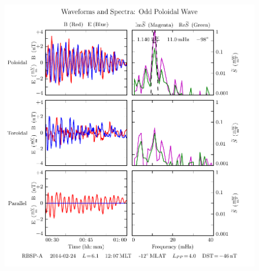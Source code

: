 \begin{figure}[!htb]
    \centering
    \includegraphics[width=\textwidth]{figures/sample_event_strong.pdf}
    \caption[Waveforms and Spectra for a Strong Pc4 Event]{
      \todo{$\cdots$}
    }
    \label{fig_sample_event_strong}
\end{figure}

